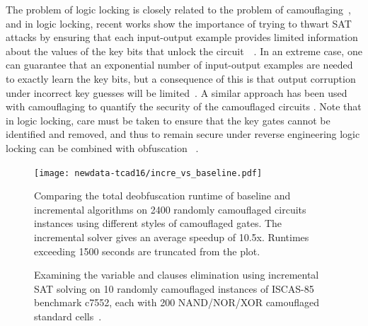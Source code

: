 \documentclass[thesis]{umassthesis}  %
\begin{document}
{The problem of logic locking is closely related to the problem of camouflaging~\cite{yasin-transforming}, and in logic locking, recent works show the importance of trying to thwart SAT attacks by ensuring that each input-output example provides limited information about the values of the key bits that unlock the circuit~\cite{yasin2016sarlock}~\cite{xie2016mitigatingsat}. In an extreme case, one can guarantee that an exponential number of input-output examples are needed to exactly learn the key bits, but a consequence of this is that output corruption under incorrect key guesses will be limited~\cite{yasin2016sarlock}. A similar approach has been used with camouflaging to quantify the security of the camouflaged circuits \cite{Yasin-iccad-16} \cite{MengLi-iccad-16}.  Note that in logic locking, care must be taken to ensure that the key gates cannot be identified and removed, and thus to remain secure under reverse engineering logic locking can be combined with obfuscation~\cite{yasin2016sarlock} \cite{shahzad-date17}}. 


\begin{figure}[!hbt]
  \centering
   \texttt{[image: newdata-tcad16/incre\_vs\_baseline.pdf]} 
    \caption{Comparing the total deobfuscation runtime of baseline and incremental algorithms on 2400 randomly camouflaged circuits instances using different styles of camouflaged gates. The incremental solver gives an average speedup of 10.5x. Runtimes exceeding 1500 seconds are truncated from the plot.}
        \vspace{-2mm}
    \label{fig:incre_vs_baseline}
  \end{figure}

\begin{figure}[!ht]
  \centering
    \hspace{20pt}
    \caption{Examining the variable and clauses elimination using incremental SAT solving on 10 randomly camouflaged instances of ISCAS-85 benchmark c7552, each with 200 NAND/NOR/XOR camouflaged standard cells~\cite{rajendran-13}.}
    \vspace{-2mm}
    \label{fig:study_incremental}
  \end{figure}
\end{document}
